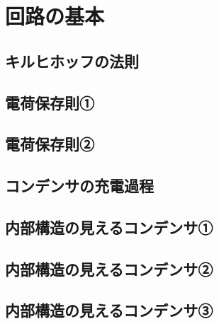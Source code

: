 \documentclass[../../uem_phy_std_a.tex]{subfiles}
\begin{document}
    \section{回路の基本}
    \subsection{キルヒホッフの法則}
        
        \vspace{20pt}    
        \vfill
    \subsection{電荷保存則①}
        
        \vspace{20pt}    
        \vfill
    \subsection{電荷保存則②}
        
        \vspace{20pt}    
        \vfill
    \subsection{コンデンサの充電過程}
        
        \vspace{20pt}    
        \vfill
    \subsection{内部構造の見えるコンデンサ①}
        
        \vspace{20pt}    
        \vfill
    \subsection{内部構造の見えるコンデンサ②}
        
        \vspace{20pt}    
        \vfill
    \subsection{内部構造の見えるコンデンサ③}
        
        \vspace{20pt}    
        \vfill
\end{document}
